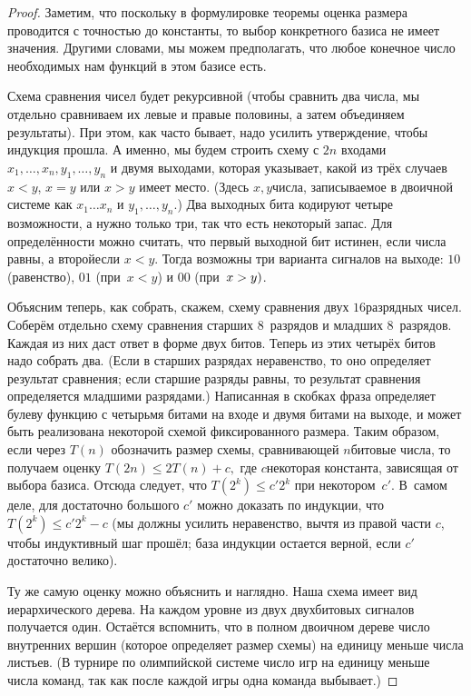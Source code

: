 \begin{proof}
Заметим, что поскольку в формулировке теоремы
оценка размера проводится с точностью до константы,
то выбор конкретного базиса не имеет значения. Другими
словами, мы можем предполагать, что любое конечное
число необходимых нам функций в этом базисе есть.

Схема сравнения чисел будет рекурсивной (чтобы
сравнить два числа, мы отдельно сравниваем их левые и
правые половины, а затем объединяем результаты). При
этом, как часто бывает, надо усилить утверждение,
чтобы индукция прошла. А именно, мы будем строить
схему с $2n$ входами $x_1,\dots,x_n,y_1,\dots,y_n$ и
двумя выходами, которая указывает, какой из трёх
случаев $x<y$, $x=y$ или $x>y$ имеет место. (Здесь
$x,y$\т числа, записываемое в двоичной системе как
$x_1\dots x_n$ и $y_1,\dots,y_n$.) Два выходных бита кодируют
четыре возможности, а нужно только три, так что есть
некоторый запас. Для определённости можно считать,
что первый выходной бит истинен, если числа равны, а
второй\т если $x<y$. Тогда возможны три варианта
сигналов на выходе: $10$ (равенство), $01$
(при~$x<y$) и $00$ (при~$x\hm>y)$.

Объясним теперь, как собрать, скажем, схему сравнения
двух $16$\д разрядных чисел. Соберём отдельно
схему сравнения старших $8$~разрядов и младших
$8$~разрядов. Каждая из них даст ответ в форме
двух битов. Теперь из этих четырёх битов надо
собрать два. (Если в старших разрядах неравенство,
то оно определяет результат сравнения; если старшие
разряды равны, то результат сравнения определяется
младшими разрядами.) Написанная в скобках фраза
определяет булеву функцию с четырьмя битами на входе и
двумя битами на выходе, и может быть реализована
некоторой схемой фиксированного размера. Таким образом,
если через $T(n)$ обозначить размер схемы, сравнивающей
$n$\д битовые числа, то получаем оценку
        $
T(2n)\le 2T(n)+c,
        $
где $c$\т некоторая константа, зависящая от выбора
базиса. Отсюда следует, что $T(2^k)\le c'2^k$
при некотором~$c'$. В~самом деле, для достаточно
большого $c'$ можно доказать по индукции, что
        $
T(2^k) \le c'2^k - c
        $
(мы должны усилить неравенство, вычтя из правой части
$c$, чтобы индуктивный шаг прошёл; база индукции
остается верной, если $c'$ достаточно велико).

Ту же самую оценку можно объяснить и наглядно. Наша
схема имеет вид иерархического дерева. На каждом
уровне из двух двухбитовых сигналов получается один.
Остаётся вспомнить, что в полном двоичном дереве
число внутренних вершин (которое определяет размер схемы)
на единицу меньше числа листьев. (В турнире по олимпийской
системе число игр на единицу меньше числа команд, так
как после каждой игры одна команда выбывает.)


\end{proof}
